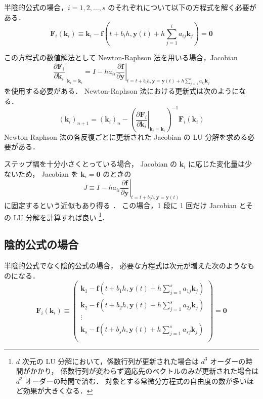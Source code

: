 半陰的公式の場合，$i = 1, 2, \ldots, s$ のそれぞれについて以下の方程式を解く必要がある．
\begin{equation}
    \bm{F}_i(\bm{k}_i)
    \equiv \bm{k}_i - \bm{f}\left(t + b_i h, \bm{y}(t) + h \sum_{j = 1}^i a_{ij} \bm{k}_j \right)
    = \bm{0}
    \label{eq:ode_runge-kutta_semi-implicit-equation}
\end{equation}

この方程式の数値解法として
Newton-Raphson 法を用いる場合，Jacobian
\begin{equation}
    \left. \frac{\partial \bm{F}_i}{\partial \bm{k}_i} \right|_{\bm{k}_i = \bm{k}_i}
    = I - h a_{ii}
    \left. \frac{\partial \bm{f}}{\partial \bm{y}}
    \right|_{t = t + b_i h, \bm{y} = \bm{y}(t) + h \sum_{j = 1}^i a_{ij} \bm{k}_j}
\end{equation}
を使用する必要がある．
Newton-Raphson 法における更新式は次のようになる．
\begin{equation}
    (\bm{k}_i)_{n+1} = (\bm{k}_i)_{n}
    - \left(\left. \frac{\partial \bm{F}_i}{\partial \bm{k}_i} \right|_{\bm{k}_i = \bm{k}_i}\right)^{-1}
    \bm{F}_i(\bm{k}_i)
\end{equation}
Newton-Raphson 法の各反復ごとに更新された Jacobian の LU 分解を求める必要がある．

ステップ幅を十分小さくとっている場合，
Jacobian の $\bm{k}_i$ に応じた変化量は少ないため，
Jacobian を $\bm{k}_i = \bm{0}$ のときの
\begin{equation}
    J \equiv I - h a_{ii}
    \left. \frac{\partial \bm{f}}{\partial \bm{y}}
    \right|_{t = t + b_i h, \bm{y} = \bm{y}(t)}
\end{equation}
に固定するという近似もあり得る
\cite[6.2 節 (c)]{Mitsui1993}．
この場合，1 段に 1 回だけ Jacobian とその LU 分解を計算すれば良い
\footnote{$d$ 次元の LU 分解において，係数行列が更新された場合は $d^3$ オーダーの時間がかかり，%
    係数行列が変わらず適応先のベクトルのみが更新された場合は $d^2$ オーダーの時間で済む．%
    対象とする常微分方程式の自由度の数が多いほど効果が大きくなる．}．

\subsection{陰的公式の場合}

半陰的公式でなく陰的公式の場合，
必要な方程式は次元が増えた次のようなものになる．
\begin{equation}
    \bm{F}_i(\bm{k}_i)
    \equiv
    \begin{pmatrix}
        \bm{k}_1 - \bm{f}\left(t + b_1 h, \bm{y}(t) + h \sum_{j = 1}^s a_{1j} \bm{k}_j \right) \\
        \bm{k}_2 - \bm{f}\left(t + b_2 h, \bm{y}(t) + h \sum_{j = 1}^s a_{2j} \bm{k}_j \right) \\
        \vdots                                                                                 \\
        \bm{k}_s - \bm{f}\left(t + b_s h, \bm{y}(t) + h \sum_{j = 1}^s a_{sj} \bm{k}_j \right) \\
    \end{pmatrix}
    = \bm{0}
    \label{eq:ode_runge-kutta_implicit-equation}
\end{equation}


